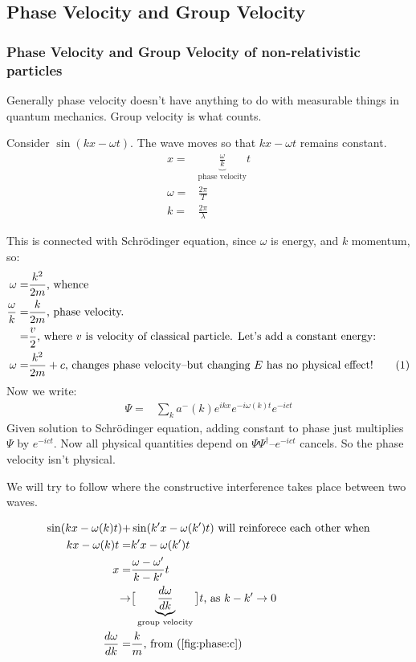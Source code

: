 \documentclass[]{article}
\newcommand\numberthis{\addtocounter{equation}{1}\tag{\theequation}}
\begin{document}
\subsection{Phase Velocity and Group Velocity}

\subsubsection{Phase Velocity and Group Velocity of non-relativistic particles}
Generally phase velocity doesn't have anything to do with measurable things in quantum mechanics. Group velocity is what counts.

Consider $\sin(kx-\omega t)$. The wave moves so that $kx-\omega t$ remains constant.
\begin{align*}
x =& \underbrace{\frac{\omega}{k}}_\text{phase velocity} t\\
\omega =& \frac{2 \pi}{T}\\
k =& \frac{2 \pi}{\lambda}
\end{align*}

This is connected with Schr\"odinger equation, since $\omega$ is energy, and $k$ momentum, so:
\begin{align*}
\omega=&\frac{k^2}{2m} \text{, whence}\\
\frac{\omega}{k}=&\frac{k}{2m} \text{, phase velocity.}\\
=& \frac{v}{2}  \text{, where $v$ is velocity of classical particle. Let's add a constant energy:}\\
\omega=&\frac{k^2}{2m}+c \text{, changes phase velocity--but changing $E$ has no physical effect!} \numberthis \label{fig:phase:c}
\end{align*}
Now we write:
\begin{align*}
	\Psi =& \sum_k a^-(k) e^{ikx}e^{- i \omega(k) t} e^{-i c t}
\end{align*}
Given solution to Schr\"odinger equation, adding constant to phase just multiplies $\Psi$ by $e^{-i c t}$. Now all physical quantities depend on $\Psi\Psi^\dagger$--$e^{-i c t}$ cancels. So the phase velocity isn't physical.

We will try to follow where the constructive interference takes place between two waves.

\begin{align*}
	\sin(kx-\omega(k)t) +& \sin(k^\prime x-\omega(k^\prime)t)\text{ will reinforece each other when}\\
	kx-\omega(k)t=&k^\prime x-\omega(k^\prime)t\\
	x =& \frac{\omega-\omega^\prime}{k-k^\prime}t\\
	\rightarrow & \big[\underbrace{\frac{d \omega}{dk}}_\text{group velocity}\big] t \text{, as $k-k^\prime \rightarrow 0$}\\
	\frac{d \omega}{dk}=&\frac{k}{m} \text{, from (\ref{fig:phase:c})}
\end{align*}
\end{document}
